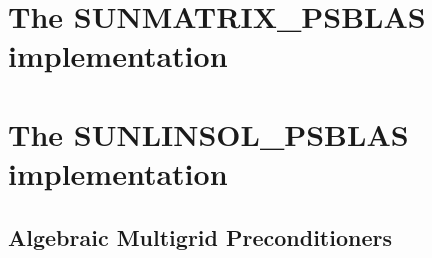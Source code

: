 \documentclass[twoside,a4paper]{refart}
\begin{document}
\section{The SUNMATRIX\_PSBLAS implementation}\label{sec:sunmatrix}

\section{The SUNLINSOL\_PSBLAS implementation}\label{sec:sunlinsol}

\subsection{Algebraic Multigrid Preconditioners}

\printbibliography
\end{document}
